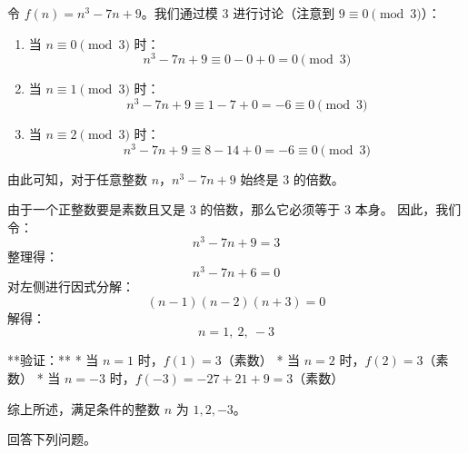 \begin{questions}
\begin{solution}
令 $f(n) = n^3 - 7n + 9$。我们通过模 3 进行讨论（注意到 $9 \equiv 0 \pmod 3$）：
\begin{enumerate}
    \item 当 $n \equiv 0 \pmod 3$ 时：
    \[ n^3 - 7n + 9 \equiv 0 - 0 + 0 = 0 \pmod 3 \]
    \item 当 $n \equiv 1 \pmod 3$ 时：
    \[ n^3 - 7n + 9 \equiv 1 - 7 + 0 = -6 \equiv 0 \pmod 3 \]
    \item 当 $n \equiv 2 \pmod 3$ 时：
    \[ n^3 - 7n + 9 \equiv 8 - 14 + 0 = -6 \equiv 0 \pmod 3 \]
\end{enumerate}
由此可知，对于任意整数 $n$，$n^3 - 7n + 9$ 始终是 3 的倍数。

由于一个正整数要是素数且又是 3 的倍数，那么它必须等于 3 本身。
因此，我们令：
\[ n^3 - 7n + 9 = 3 \]
整理得：
\[ n^3 - 7n + 6 = 0 \]
对左侧进行因式分解：
\[ (n-1)(n-2)(n+3) = 0 \]
解得：
\[ n = 1, \ 2, \ -3 \]

**验证：**
* 当 $n=1$ 时，$f(1) = 3$（素数）
* 当 $n=2$ 时，$f(2) = 3$（素数）
* 当 $n=-3$ 时，$f(-3) = -27 + 21 + 9 = 3$（素数）

综上所述，满足条件的整数 $n$ 为 $1, 2, -3$。
\end{solution}

\question
回答下列问题。
\end{questions}
